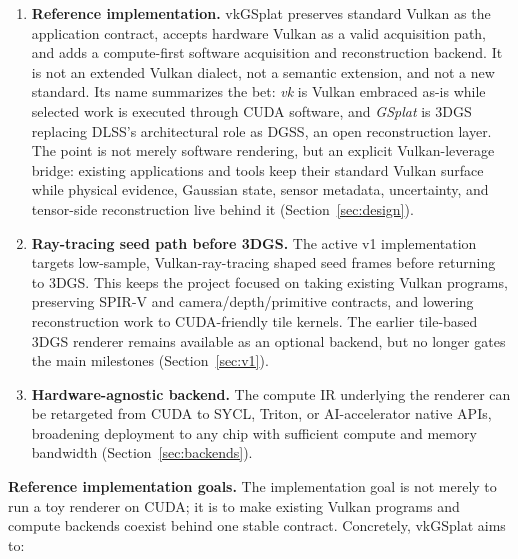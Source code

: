 \documentclass[10pt,journal,onecolumn]{IEEEtran}
\begin{document}
\begin{enumerate}
    \item \textbf{Reference implementation.} vkGSplat preserves standard
    Vulkan as the application contract, accepts hardware Vulkan as a valid
    acquisition path, and adds a compute-first software acquisition and
    reconstruction backend. It is not an extended Vulkan dialect, not a semantic
    extension, and not a new standard. Its name summarizes the bet: \emph{vk} is Vulkan
    embraced as-is while selected work is executed through CUDA software, and
    \emph{GSplat} is 3DGS replacing DLSS's architectural role as DGSS, an open
    reconstruction layer. The point is not merely software rendering, but an
    explicit Vulkan-leverage bridge: existing applications and tools keep their
    standard Vulkan surface while physical evidence, Gaussian state, sensor
    metadata, uncertainty, and tensor-side reconstruction live behind it
    (Section~\ref{sec:design}).

    \item \textbf{Ray-tracing seed path before 3DGS.}
    The active v1 implementation targets low-sample, Vulkan-ray-tracing
    shaped seed frames before returning to 3DGS. This keeps the project
    focused on taking existing Vulkan programs, preserving SPIR-V and
    camera/depth/primitive contracts, and lowering reconstruction work
    to CUDA-friendly tile kernels. The earlier tile-based 3DGS renderer
    remains available as an optional backend, but no longer gates the
    main milestones (Section~\ref{sec:v1}).

    \item \textbf{Hardware-agnostic backend.} The compute IR underlying
    the renderer can be retargeted from CUDA to SYCL, Triton, or
    AI-accelerator native APIs, broadening deployment to any chip with
    sufficient compute and memory bandwidth (Section~\ref{sec:backends}).
\end{enumerate}

\textbf{Reference implementation goals.} The implementation goal is not merely to run a
toy renderer on CUDA; it is to make existing Vulkan programs and
compute backends coexist behind one stable contract. Concretely, vkGSplat
aims to:
\end{document}
